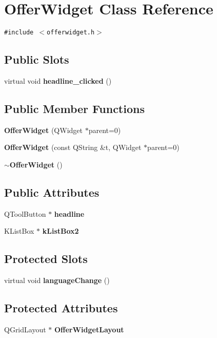 \section{Offer\-Widget Class Reference}
\label{classOfferWidget}
{\tt \#include $<$offerwidget.h$>$}

\subsection*{Public Slots}
\begin{CompactItemize}
\item 
virtual void {\bf headline\_\-clicked} ()
\end{CompactItemize}
\subsection*{Public Member Functions}
\begin{CompactItemize}
\item 
{\bf Offer\-Widget} (QWidget $\ast$parent=0)
\item 
{\bf Offer\-Widget} (const QString \&t, QWidget $\ast$parent=0)
\item 
{\bf $\sim$Offer\-Widget} ()
\end{CompactItemize}
\subsection*{Public Attributes}
\begin{CompactItemize}
\item 
QTool\-Button $\ast$ {\bf headline}
\item 
KList\-Box $\ast$ {\bf k\-List\-Box2}
\end{CompactItemize}
\subsection*{Protected Slots}
\begin{CompactItemize}
\item 
virtual void {\bf language\-Change} ()
\end{CompactItemize}
\subsection*{Protected Attributes}
\begin{CompactItemize}
\item 
QGrid\-Layout $\ast$ {\bf Offer\-Widget\-Layout}
\end{CompactItemize}



